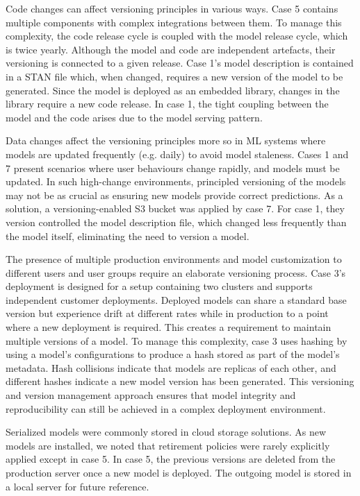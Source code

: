 Code changes can affect versioning principles in various ways. Case 5 contains multiple components with complex integrations between them. To manage this complexity, the code release cycle is coupled with the model release cycle, which is twice yearly. Although the model and code are independent artefacts, their versioning is connected to a given release. Case 1's model description is contained in a STAN file which, when changed, requires a new version of the model to be generated. Since the model is deployed as an embedded library, changes in the library require a new code release. In case 1, the tight coupling between the model and the code arises due to the model serving pattern.

Data changes affect the versioning principles more so in ML systems where models are updated frequently (e.g. daily) to avoid model staleness. Cases 1 and 7 present scenarios where user behaviours change rapidly, and models must be updated. In such high-change environments, principled versioning of the models may not be as crucial as ensuring new models provide correct predictions. As a solution, a versioning-enabled S3 bucket was applied by case 7. For case 1, they version controlled the model description file, which changed less frequently than the model itself, eliminating the need to version a model.

The presence of multiple production environments and model customization to different users and user groups require an elaborate versioning process. Case 3's deployment is designed for a setup containing two clusters and supports independent customer deployments. Deployed models can share a standard base version but experience drift at different rates while in production to a point where a new deployment is required. This creates a requirement to maintain multiple versions of a model. To manage this complexity, case 3 uses hashing by using a model's configurations to produce a hash stored as part of the model's metadata. Hash collisions indicate that models are replicas of each other, and different hashes indicate a new model version has been generated. This versioning and version management approach ensures that model integrity and reproducibility can still be achieved in a complex deployment environment.

Serialized models were commonly stored in cloud storage solutions. As new models are installed, we noted that retirement policies were rarely explicitly applied except in case 5. In case 5, the previous versions are deleted from the production server once a new model is deployed. The outgoing model is stored in a local server for future reference.

